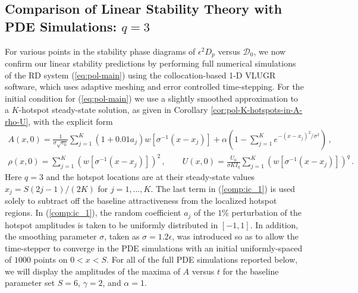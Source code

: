 \documentclass{article}%
\newcommand{\bsub}{\begin{subequations}}
\newcommand{\esub}{\end{subequations}$\!$}
\begin{document}
\subsection{Comparison of Linear Stability Theory with PDE Simulations: $q=3$}
\label{sec:numerics_q3}

For various points in the stability phase diagrams of $\epsilon^2 D_p$
versus ${\mathcal D}_0$, we now confirm our linear stability
predictions by performing full numerical simulations of the RD system
(\ref{eq:pol-main}) using the collocation-based 1-D VLUGR \cite{vlug}
software, which uses adaptive meshing and error controlled
time-stepping. For the initial condition for (\ref{eq:pol-main}) we
use a slightly smoothed approximation to a $K$-hotspot steady-state
solution, as given in Corollary \ref{cor:pol-K-hotspots-in-A-rho-U},
with the explicit form 
\bsub \label{comp:ic}
\begin{gather}
  A(x,0) = \frac{1}{\sigma \sqrt{v_0}} \sum_{j=1}^{K} \left(1+0.01 a_j\right) 
    w\left[\sigma^{-1}(x-x_j)\right] + \alpha \left( 1- \sum_{j=1}^{K}
   e^{-(x-x_j)^2/\sigma^2}\right) \,, \label{comp:ic_1}\\
 \rho(x,0) = \sum_{j=1}^{K} \left( w[\sigma^{-1}(x-x_j)]\right)^2 \,, \qquad
  U(x,0)= \frac{U_0}{\sigma K I_q} \sum_{j=1}^{K}
  \left(w[\sigma^{-1}(x-x_j)]\right)^q \,.
\end{gather}
\esub Here $q=3$ and the hotspot locations are at their steady-state
values $x_j=S(2j-1)/(2K)$ for $j=1,\ldots,K$.  The last term in
(\ref{comp:ic_1}) is used solely to subtract off the baseline
attractiveness from the localized hotspot regions. In
(\ref{comp:ic_1}), the random coefficient $a_j$ of the $1\%$
perturbation of the hotspot amplitudes is taken to be uniformly
distributed in $[-1,1]$. In addition, the smoothing parameter
$\sigma$, taken as $\sigma=1.2\epsilon$, was introduced so as to allow
the time-stepper to converge in the PDE simulations with an initial
uniformly-spaced of $1000$ points on $0<x<S$. For all of the full PDE
simulations reported below, we will display the amplitudes of the maxima
of $A$ versus $t$ for the baseline parameter set $S=6$, $\gamma=2$,
and $\alpha=1$.
\end{document}
